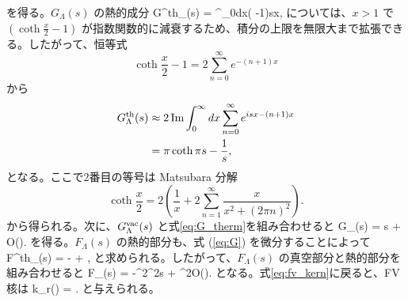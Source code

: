 を得る。$G_{\Lambda}(s)$ の熱的成分
\be
	G^{\rm th}_{\Lambda}(s) = \int^{\Lambda}_0dx\left(\coth{} -1\right)\sin sx,
\ee
については、$x>1$ で $(\coth\frac{x}{2}-1)$ が指数関数的に減衰するため、積分の上限を無限大まで拡張できる。したがって、恒等式
\[
	\coth\frac{x}{2} -1 = 2\sum^{\infty}_{n=0}e^{-(n+1)x}
\]
から
\begin{align}\label{eq:G_therm}
	G^{\rm th}_{\Lambda}(s) &\approx 2\,{\rm Im}\int^{\infty}_0dx\sum^{\infty}_{n=0}e^{isx - (n+1)x} \nonumber\\
    &= \pi\coth \pi s - \frac{1}{s},
\end{align}
となる。ここで2番目の等号は Matsubara 分解
\[
	\coth\frac{x}{2} = 2\left(\frac{1}{x} + 2\sum^{\infty}_{n=1}\frac{x}{x^2+(2\pi n)^2}\right).
\]
から得られる。次に、$G^{\rm vac}_{\Lambda}(s)$ と式\eqref{eq:G_therm}を組み合わせると
\be\label{eq:G}
	G_{\Lambda}(s) = \pi\coth\pi s + \Lambda O\left(\right).
\ee
を得る。$F_{\Lambda}(s)$ の熱的部分も、式 (\ref{eq:G}) を微分することによって
\be
	F^{\rm th}_{\Lambda}(s) = - + ,
\ee
と求められる。したがって、$F_{\Lambda}(s)$ の真空部分と熱的部分を組み合わせると
\be\label{eq:FL}
	F_{\Lambda}(s) = -\pi^2\csh^2\pi s + \Lambda^2O\left(\right).
\ee
となる。式\eqref{eq:fv_kern}に戻ると、FV 核は
\be
	k_r(\tau) =  \frac{2\eta}{\pi}.
\ee
と与えられる。

\label{sec:functional}

